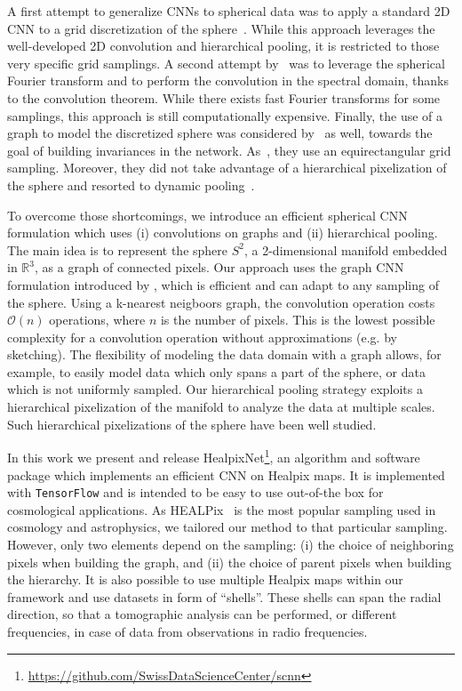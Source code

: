 \documentclass[final,twocolumn,3p,times,authoryear]{elsarticle}
\newcommand{\todo}[1]{{\color[rgb]{.6,.1,.6}{#1}}}
\newcommand{\1}{\b{1}}              %
\newcommand{\0}{\b{0}}              %
\newcommand{\pkg}[1]{\texttt{#1}}
\begin{document}
A first attempt to generalize CNNs to spherical data was to apply a standard 2D CNN to a grid discretization of the sphere~\citep{boomsma2017spherical}. While this approach leverages the well-developed 2D convolution and hierarchical pooling, it is restricted to those very specific grid samplings.
A second attempt by~\citet{cohen2018spherical} was to leverage the spherical Fourier transform and to perform the convolution in the spectral domain, thanks to the convolution theorem. While there exists fast Fourier transforms for some samplings, this approach is still computationally expensive.
Finally, the use of a graph to model the discretized sphere was considered by~\citet{khasanova2017graph} as well, towards the goal of building invariances in the network. As~\citep{boomsma2017spherical}, they use an equirectangular grid sampling. Moreover, they did not take advantage of a hierarchical pixelization of the sphere and resorted to dynamic pooling~\citep{kalchbrenner2014dcnn}.

To overcome those shortcomings, we introduce an efficient spherical CNN formulation which uses (i) convolutions on graphs and (ii) hierarchical pooling. The main idea is to represent the sphere $S^2$, a 2-dimensional manifold embedded in $\mathbb{R}^3$, as a graph of connected pixels.
Our approach uses the graph CNN formulation introduced by \citet{defferrard2016convolutional}, which is efficient and can adapt to any sampling of the sphere. Using a k-nearest neigboors graph, the convolution operation costs $\mathcal{O}(n)$ operations, where $n$ is the number of pixels. This is the lowest possible complexity for a convolution operation without approximations (e.g. by sketching).
The flexibility of modeling the data domain with a graph allows, for example, to easily model data which only spans a part of the sphere, or data which is not uniformly sampled.
Our hierarchical pooling strategy exploits a hierarchical pixelization of the manifold to analyze the data at multiple scales. Such hierarchical pixelizations of the sphere have been well studied.

In this work we present and release HealpixNet\footnote{\url{https://github.com/SwissDataScienceCenter/scnn} \todo{change location}}, an algorithm and software package which implements an efficient CNN on Healpix maps. It is implemented with \pkg{TensorFlow} \citep{abadi2016tensorflow} and is intended to be easy to use out-of-the box for cosmological applications.
As HEALPix~\citep{gorski2005healpix} is the most popular sampling used in cosmology and astrophysics, we tailored our method to that particular sampling. However, only two elements depend on the sampling: (i) the choice of neighboring pixels when building the graph, and (ii) the choice of parent pixels when building the hierarchy.
It is also possible to use multiple Healpix maps within our framework and use datasets in form of ``shells''. These shells can span the radial direction, so that a tomographic analysis can be performed, or different frequencies, in case of data from observations in radio frequencies.
\end{document}
